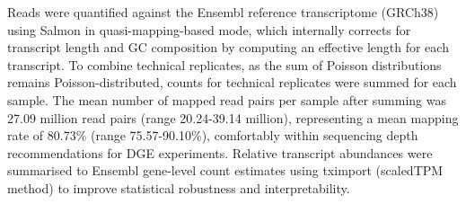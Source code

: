 Reads were quantified against the Ensembl reference transcriptome (GRCh38) using Salmon\autocite{patro2017SalmonProvidesFast} in quasi-mapping-based mode, 
which internally corrects for transcript length and GC composition by computing an effective length for each transcript.
To combine technical replicates, as the sum of Poisson distributions remains Poisson-distributed, counts for technical replicates were summed for each sample.
%
%
The mean number of mapped read pairs per sample after summing was 27.09 million read pairs (range 20.24-39.14 million), representing a mean mapping rate of 80.73\% (range 75.57-90.10\%), comfortably within sequencing depth recommendations for \gls{DGE} experiments\autocite{liu2014RNAseqDifferentialExpression}.
Relative transcript abundances were summarised to Ensembl gene-level count estimates using tximport (scaledTPM method) to improve statistical robustness and interpretability\autocite{soneson2016DifferentialAnalysesRNAseq}.

